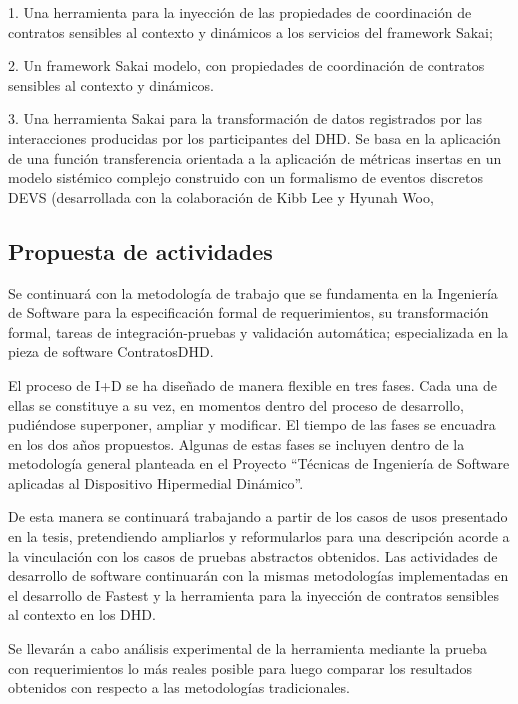 \begin{itemize}
1. Una herramienta para la inyección de las propiedades de coordinación de
contratos sensibles al contexto y dinámicos a los servicios del framework Sakai;

2. Un framework Sakai modelo, con propiedades de coordinación de contratos
sensibles al contexto y dinámicos.

3. Una herramienta Sakai para la transformación de datos registrados por las
interacciones producidas por los participantes del DHD. Se basa en la aplicación
de una función transferencia orientada a la aplicación de métricas insertas en
un modelo sistémico complejo construido con un formalismo de eventos discretos
DEVS (desarrollada con la colaboración de Kibb Lee y Hyunah Woo,

\end{itemize}

\subsection{Propuesta de actividades}

Se continuará con la metodología de trabajo que se fundamenta en la Ingeniería
de Software para la especificación formal de requerimientos, su transformación
formal,  tareas de integración-pruebas y validación automática; especializada en
la pieza de software ContratosDHD.

El proceso de I+D se ha diseñado de manera flexible en tres fases. Cada una de
ellas se constituye a su vez, en momentos dentro del proceso de desarrollo,
pudiéndose superponer, ampliar y modificar. El tiempo de las fases se encuadra
en los dos años propuestos. Algunas de estas fases se incluyen dentro de la
metodología general planteada en el Proyecto “Técnicas de Ingeniería de Software
aplicadas al Dispositivo Hipermedial Dinámico”.

De esta manera se continuará trabajando a partir de los casos de usos presentado
en la tesis, pretendiendo ampliarlos y reformularlos para una descripción acorde
a la vinculación con los casos de pruebas abstractos obtenidos.
Las actividades de desarrollo de software continuarán con la mismas metodologías
implementadas  en el desarrollo de Fastest y la herramienta para la inyección de
contratos sensibles al contexto en los DHD.

Se llevarán a cabo análisis experimental de la herramienta mediante la prueba
con requerimientos lo más reales posible para luego comparar los resultados
obtenidos con respecto a las metodologías tradicionales.

